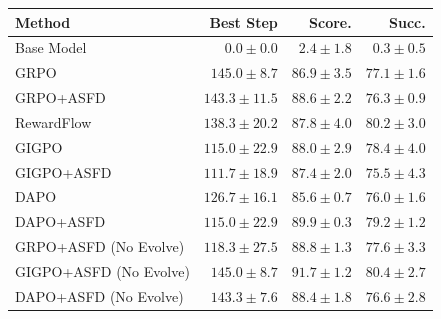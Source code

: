\begin{tabular}{lrrr}
\toprule
Method & Best Step & Score. & Succ. \\
\midrule
Base Model & $0.0 \pm 0.0$ & $2.4 \pm 1.8$ & $0.3 \pm 0.5$ \\
GRPO & $145.0 \pm 8.7$ & $86.9 \pm 3.5$ & $77.1 \pm 1.6$ \\
GRPO+ASFD & $143.3 \pm 11.5$ & $88.6 \pm 2.2$ & $76.3 \pm 0.9$ \\
RewardFlow & $138.3 \pm 20.2$ & $87.8 \pm 4.0$ & $80.2 \pm 3.0$ \\
GIGPO & $115.0 \pm 22.9$ & $88.0 \pm 2.9$ & $78.4 \pm 4.0$ \\
GIGPO+ASFD & $111.7 \pm 18.9$ & $87.4 \pm 2.0$ & $75.5 \pm 4.3$ \\
DAPO & $126.7 \pm 16.1$ & $85.6 \pm 0.7$ & $76.0 \pm 1.6$ \\
DAPO+ASFD & $115.0 \pm 22.9$ & $89.9 \pm 0.3$ & $79.2 \pm 1.2$ \\
GRPO+ASFD (No Evolve) & $118.3 \pm 27.5$ & $88.8 \pm 1.3$ & $77.6 \pm 3.3$ \\
GIGPO+ASFD (No Evolve) & $145.0 \pm 8.7$ & $91.7 \pm 1.2$ & $80.4 \pm 2.7$ \\
DAPO+ASFD (No Evolve) & $143.3 \pm 7.6$ & $88.4 \pm 1.8$ & $76.6 \pm 2.8$ \\
\bottomrule
\end{tabular}
